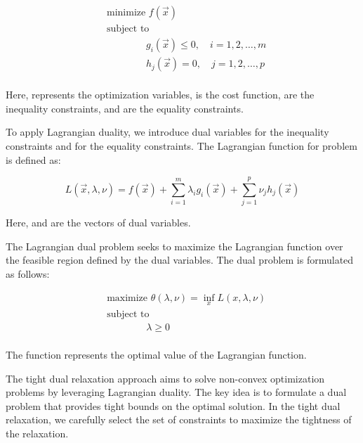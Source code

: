 \begin{align*}
	&\text{minimize } f(\vec{x}) \\
	& \text{subject to }         \\ 
	&\qquad \qquad g_i(\vec{x}) \leq 0, \quad i = 1, 2, \ldots, m \\
	&\qquad \qquad h_j(\vec{x}) = 0, \quad j = 1, 2, \ldots, p \\
\end{align*}


Here,  represents the optimization variables,  is the cost function,  are the inequality constraints, and  are the equality constraints.

To apply Lagrangian duality, we introduce dual variables  for the inequality constraints and  for the equality constraints. The Lagrangian function for problem  is defined as:

\begin{equation}
	L(\vec{x}, \lambda, \nu) = f(\vec{x}) + \sum_{i=1}^{m} \lambda_i g_i(\vec{x}) + \sum_{j=1}^{p} \nu_j h_j(\vec{x})
\end{equation}


Here,  and  are the vectors of dual variables.

The Lagrangian dual problem seeks to maximize the Lagrangian function over the feasible region defined by the dual variables. The dual problem is formulated as follows:

\begin{align*}
	 & \text{maximize } \theta(\lambda, \nu) = \inf_{x} L(x, \lambda, \nu) \\
	 & \text{subject to } \\
	 & \qquad \qquad \lambda \geq 0\\
\end{align*}


The function \mvar{\theta(\lambda, \nu)} represents the optimal value of the Lagrangian function.

The tight dual relaxation approach aims to solve non-convex optimization problems by leveraging Lagrangian duality. The key idea is to formulate a dual problem that provides tight bounds on the optimal solution. In the tight dual relaxation, we carefully select the set of constraints to maximize the tightness of the relaxation.

